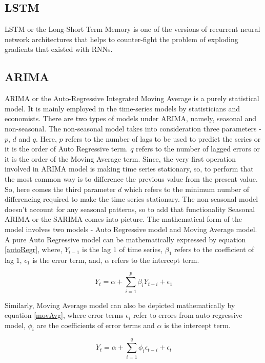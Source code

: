\documentclass[10pt,journal,compsoc]{IEEEtran}
\begin{document}
\subsection{LSTM}
LSTM or the Long-Short Term Memory is one of the versions of recurrent neural network architectures that helps to counter-fight the problem of exploding gradients that existed with RNNs.  

\subsection{ARIMA}
ARIMA or the Auto-Regressive Integrated Moving Average is a purely statistical model. It is mainly employed in the time-series models by statisticians and economists. There are two types of models under ARIMA, namely, seasonal and non-seasonal. The non-seasonal model takes into consideration three parameters - \(p\), \(d\) and \(q\). Here, \(p\) refers to the number of lags to be used to predict the series or it is the order of Auto Regressive term. \(q\) refers to the number of lagged errors or it is the order of the Moving Average term. Since, the very first operation involved in ARIMA model is making time series stationary, so, to perform that the most common way is to difference the previous value from the present value. So, here comes the third parameter \(d\) which refers to the minimum number of differencing required to make the time series stationary. The non-seasonal model doesn't account for any seasonal patterns, so to add that functionality Seasonal ARIMA or the SARIMA comes into picture. The mathematical form of the model involves two models - Auto Regressive model and Moving Average model. A pure Auto Regressive model can be mathematically expressed by equation \ref{autoRegr}, 	where, \(Y_{t-1}\) is the lag \(1\) of time series, \(\beta_1\) refers to the coefficient of lag \(1\), \(\epsilon_1\) is the error term, and, \(\alpha\) refers to the intercept term.

\begin{equation}
	\label{autoRegr}
	Y_t = \alpha + \sum_{i = 1}^{p}\beta_i Y_{t-i} + \epsilon_1
\end{equation}

Similarly, Moving Average model can also be depicted mathematically by equation \ref{movAvg}, where error terms \(\epsilon_i\) refer to errors from auto regressive model, \(\phi_i\) are the coefficients of error terms and \(\alpha\) is the intercept term. 

\begin{equation}
	\label{movAvg}
	Y_t = \alpha + \sum_{i = 1}^{q}\phi_i \epsilon_{t-i} + \epsilon_t
\end{equation}
\end{document}
